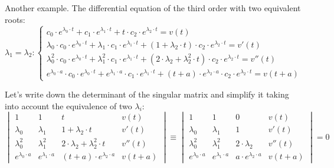 \documentclass[a4paper, 11pt, oneside]{book}
\begin{document}
Another example. The differential equation of the third order with two equivalent roots:
\begin{equation}\label{eq:monolinear-equation-3order-2rep-roots}
  \lambda_1 = \lambda_2:
  \begin{cases}
    c_0 \cdot e^{\lambda_0 \cdot t} + c_1 \cdot e^{\lambda_1 \cdot t} + t \cdot c_2 \cdot e^{\lambda_2 \cdot t} = v(t) \\
    \lambda_0 \cdot c_0 \cdot e^{\lambda_0 \cdot t} + \lambda_1 \cdot c_1 \cdot e^{\lambda_1 \cdot t} + (1 + \lambda_2 \cdot t) \cdot c_2 \cdot e^{\lambda_2 \cdot t} = v'(t) \\
    \lambda_0^2 \cdot c_0 \cdot e^{\lambda_0 \cdot t} + \lambda_1^2 \cdot c_1 \cdot e^{\lambda_1 \cdot t} + (2 \cdot \lambda_2 + \lambda_2^2 \cdot t) \cdot c_2 \cdot e^{\lambda_2 \cdot t} = v''(t) \\
    e^{\lambda_0 \cdot a} \cdot c_0 \cdot e^{\lambda_0 \cdot t} + e^{\lambda_1 \cdot a} \cdot c_1 \cdot e^{\lambda_1 \cdot t} + (t + a) \cdot e^{\lambda_2 \cdot a} \cdot c_2 \cdot e^{\lambda_2 \cdot t} = v(t + a)
  \end{cases}
\end{equation}

Let's write down the determinant of the singular matrix and simplify it taking into account the equivalence of two $\lambda_i$:
\begin{equation}\label{eq:monolinear-equation-3order-2rep-roots-2}
  \begin{vmatrix}
    1 & 1 & t & v(t) \\
    \lambda_0 & \lambda_1 & 1 + \lambda_2 \cdot t & v'(t) \\
    \lambda_0^2 & \lambda_1^2 & 2 \cdot \lambda_2 + \lambda_2^2 \cdot t & v''(t) \\
    e^{\lambda_0 \cdot a} & e^{\lambda_1 \cdot a} & (t + a) \cdot e^{\lambda_2 \cdot a} & v(t + a)
  \end{vmatrix}
  \equiv
  \begin{vmatrix}
    1 & 1 & 0 & v(t) \\
    \lambda_0 & \lambda_1 & 1 & v'(t) \\
    \lambda_0^2 & \lambda_1^2 & 2 \cdot \lambda_2 & v''(t) \\
    e^{\lambda_0 \cdot a} & e^{\lambda_1 \cdot a} & a \cdot e^{\lambda_2 \cdot a} & v(t + a)
  \end{vmatrix}
  =0
\end{equation}
\end{document}
